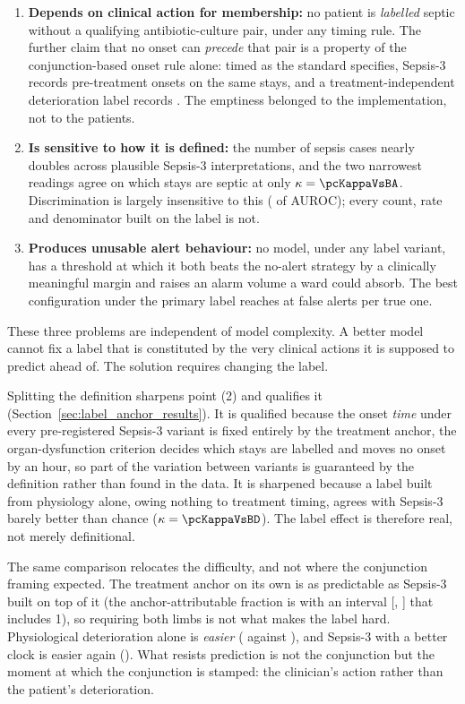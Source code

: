 \begin{enumerate}
    \item \textbf{Depends on clinical action for membership:} no patient is
    \emph{labelled} septic without a qualifying antibiotic-culture pair, under
    any timing rule. The further claim that no onset can \emph{precede} that
    pair is a property of the conjunction-based onset rule alone: timed as the
    standard specifies, Sepsis-3 records \pcPreTreatOnsetsVarF{} pre-treatment
    onsets on the same stays, and a treatment-independent deterioration label
    records \pcPreTreatOnsetsVarD{}. The emptiness belonged to the
    implementation, not to the patients.
    \item \textbf{Is sensitive to how it is defined:} the number of sepsis
    cases nearly doubles across plausible Sepsis-3 interpretations, and the two
    narrowest readings agree on which stays are septic at only
    $\kappa = \pcKappaVsBA$. Discrimination is largely insensitive to this
    (\pcSpreadLabel{} of AUROC); every count, rate and denominator built on the
    label is not.
    \item \textbf{Produces unusable alert behaviour:} no model, under any label
    variant, has a threshold at which it both beats the no-alert strategy by a
    clinically meaningful margin and raises an alarm volume a ward could
    absorb. The best configuration under the primary label reaches
    \pcUtilityMaxGbtB{} at \pcUtilityOptBurdenGbtB{} false alerts per true one.
\end{enumerate}

These three problems are independent of model complexity. A better model
cannot fix a label that is constituted by the very clinical actions it is
supposed to predict ahead of. The solution requires changing the label.

Splitting the definition sharpens point (2) and qualifies it
(Section~\ref{sec:label_anchor_results}). It is qualified because the onset
\emph{time} under every pre-registered Sepsis-3 variant is fixed entirely by the
treatment anchor, the organ-dysfunction criterion decides which stays are
labelled and moves no onset by an hour, so part of the variation between
variants is guaranteed by the definition rather than found in the data. It is
sharpened because a label built from physiology alone, owing nothing to
treatment timing, agrees with Sepsis-3 barely better than chance
($\kappa = \pcKappaVsBD$). The label effect is therefore real, not merely
definitional.

The same comparison relocates the difficulty, and not where the conjunction
framing expected. The treatment anchor on its own is as predictable as Sepsis-3
built on top of it (the anchor-attributable fraction is
\pcPhiAnchorPrimary{} with an interval
[\pcPhiAnchorCiLoPrimary, \pcPhiAnchorCiHiPrimary] that includes 1), so
requiring both limbs is not what makes the label hard. Physiological
deterioration alone is \emph{easier} (\pcAltAurocFullPrimaryD{} against
\pcAurocPrimaryB), and Sepsis-3 with a better clock is easier again
(\pcAltAurocFullPrimaryF). What resists prediction is not the conjunction but
the moment at which the conjunction is stamped: the clinician's action rather
than the patient's deterioration.


